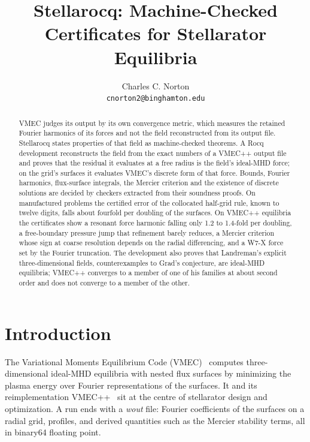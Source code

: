\documentclass[11pt]{article}
\title{Stellarocq: Machine-Checked Certificates for Stellarator Equilibria}
\author{Charles C. Norton\\\normalsize\texttt{cnorton2@binghamton.edu}}
\date{}
\begin{document}
\maketitle

\begin{abstract}
VMEC judges its output by its own convergence metric, which measures the
retained Fourier harmonics of its forces and not the field reconstructed from
its output file. Stellarocq states properties of that field as machine-checked
theorems. A Rocq development reconstructs the field from the exact numbers of a
VMEC++ output file and proves that the residual it evaluates at a free radius is
the field's ideal-MHD force; on the grid's surfaces it evaluates VMEC's discrete
form of that force. Bounds, Fourier harmonics, flux-surface integrals, the
Mercier criterion and the existence of discrete solutions are decided by
checkers extracted from their soundness proofs. On manufactured problems the
certified error of the collocated half-grid rule, known to twelve digits, falls
about fourfold per doubling of the surfaces. On VMEC++ equilibria the
certificates show a resonant force harmonic falling only 1.2 to 1.4-fold per
doubling, a free-boundary pressure jump that refinement barely reduces, a
Mercier criterion whose sign at coarse resolution depends on the radial
differencing, and a W7-X force set by the Fourier truncation. The development
also proves that Landreman's explicit three-dimensional fields, counterexamples
to Grad's conjecture, are ideal-MHD equilibria; VMEC++ converges to a member of
one of his families at about second order and does not converge to a member of
the other.
\end{abstract}

\section{Introduction}

The Variational Moments Equilibrium Code (VMEC)~\cite{hirshman1983,hirshman1986}
computes three-dimensional ideal-MHD equilibria with nested flux surfaces by
minimizing the plasma energy over Fourier representations of the surfaces. It
and its reimplementation VMEC++~\cite{schilling2025,vmecpp} sit at the centre of
stellarator design and optimization. A run ends with a \emph{wout} file: Fourier
coefficients of the surfaces on a radial grid, profiles, and derived quantities
such as the Mercier stability terms, all in binary64 floating point.
\end{document}
